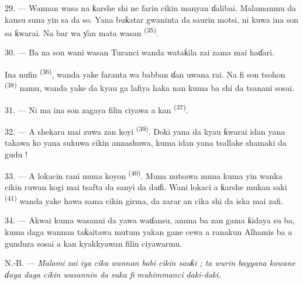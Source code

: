 29. --- Wannan wasa na ƙarshe shi ne farin cikin manyan ɗalibai.
Malamanmu da kansu suna yin sa da so. Yana buƙatar gwaninta da saurin
motsi, ni kuwa ina son sa ƙwarai. Na bar wa ƴan mata wasan
\textsuperscript{(35)}.

30. --- Ba na son wani wasan Turanci wanda wataƙila zai zama mai
haɗari.

Ina nufin \textsuperscript{(36)}, wanda yake faranta
wa babban ɗan uwana rai. Na fi son tsohon \textsuperscript{(38)} namu, wanda yake da kyau ga lafiya haka nan
kuma ba shi da tsanani sosai.

\VUsaut{4.6mm}
\VUsaut{3.0mm}

31. --- Ni ma ina son zagaya filin ciyawa a kan
\textsuperscript{(37)}.

32. --- A shekara mai zuwa zan koyi \textsuperscript{(39)}. Doki yana da kyau ƙwarai idan yana takawa
ko yana sukuwa cikin annashuwa, kuma idan yana tsallake shamaki da
gudu !

33. --- A lokacin rani muna koyon \textsuperscript{(40)}.
Muna nutsawa muna kuma yin wanka cikin ruwan kogi mai tsafta da sanyi
da daɗi. Wani lokaci a ƙarshe mukan saki \textsuperscript{(41)} wanda yake hawa sama cikin girma, da
zarar an cika shi da iska mai zafi.

34. --- Akwai kuma wasanni da yawa waɗansu, amma ba zan gama ƙidaya su
ba, kuma daga wannan taƙaitawa mutum yakan gane cewa a ranakun Alhamis
ba a gundura sosai a kan kyakkyawan filin ciyawarmu.

N.-B. --- \textit{Malami zai iya cika wannan babi cikin sauƙi ; ta}
\textit{wurin bayyana kowane ɗaya daga cikin wasannin da suka fi}
\textit{muhimmanci daki-daki.}
